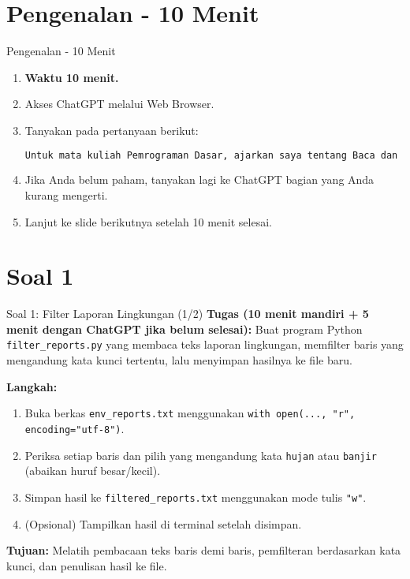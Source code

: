 \documentclass[aspectratio=169, table]{beamer}
\begin{document}
\section{Pengenalan - 10 Menit}
\begin{frame}[fragile]{Pengenalan - 10 Menit}
\vspace{20pt}
\centering
\begin{enumerate}
\item \textbf{Waktu 10 menit.}
\item Akses ChatGPT melalui Web Browser.
\item Tanyakan pada pertanyaan berikut:
\begin{lstlisting}[language=bash]
Untuk mata kuliah Pemrograman Dasar, ajarkan saya tentang Baca dan tulis File di Python yang mencakup (1) membaca dan menulis file teks, (2) penyaringan dan penghitungan data, (3) membaca dan menulis file CSV, dan (2) agregasi dan ringkasan data.
\end{lstlisting}
\item Jika Anda belum paham, tanyakan lagi ke ChatGPT bagian yang Anda kurang mengerti.
\item Lanjut ke slide berikutnya setelah 10 menit selesai.

\end{enumerate}
\end{frame}



\section{Soal 1}
\begin{frame}[fragile]{Soal 1: Filter Laporan Lingkungan (1/2)}
\vspace{15pt}
\textbf{Tugas (10 menit mandiri + 5 menit dengan ChatGPT jika belum selesai):}  
Buat program Python \texttt{filter\_reports.py} yang membaca teks laporan lingkungan, memfilter baris yang mengandung kata kunci tertentu, lalu menyimpan hasilnya ke file baru.

\textbf{Langkah:}
\begin{enumerate}
  \item Buka berkas \texttt{env\_reports.txt} menggunakan \texttt{with open(..., "r", encoding="utf-8")}.
  \item Periksa setiap baris dan pilih yang mengandung kata \texttt{hujan} atau \texttt{banjir}  
        (abaikan huruf besar/kecil).
  \item Simpan hasil ke \texttt{filtered\_reports.txt} menggunakan mode tulis \texttt{"w"}.
  \item (Opsional) Tampilkan hasil di terminal setelah disimpan.
\end{enumerate}

\textbf{Tujuan:}  
Melatih pembacaan teks baris demi baris, pemfilteran berdasarkan kata kunci, dan penulisan hasil ke file.
\end{frame}
\end{document}
